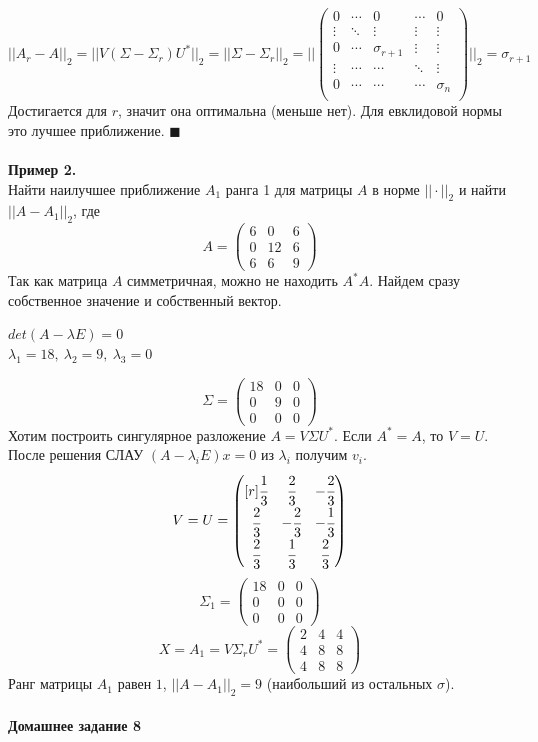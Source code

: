 \documentclass[12pt]{article}
\theoremstyle{definition}
\numberwithin{equation}{section}
\begin{document}
\[||A_r-A||_2=||V(\Sigma-\Sigma_r)U^*||_2=||\Sigma-\Sigma_r||_2 = \Bigg| \Bigg|\begin{pmatrix}
0 & \cdots & 0  & \cdots & 0\\
\vdots & \ddots & \vdots & \vdots & \vdots\\
0 & \cdots & \sigma_{r+1} &  \vdots & \vdots\\
\vdots & \cdots & \cdots & \ddots & \vdots\\
0 & \cdots & \cdots & \cdots & \sigma_n\\
\end{pmatrix}\Bigg|\Bigg|_2=\sigma_{r+1}\]
Достигается для $r$, значит она оптимальна (меньше нет). Для евклидовой нормы это лучшее приближение. $\blacksquare$\\ \\
\textbf{Пример 2.}\\
Найти наилучшее приближение $A_1$ ранга 1 для матрицы $A$ в норме $||\cdot||_2$ и найти $||A-A_1||_2$, где
\[A = \begin{pmatrix}
6 & 0 & 6\\
0 & 12 & 6\\
6 & 6 & 9
\end{pmatrix}\]
Так как матрица $A$ симметричная, можно не находить $A^*A$. Найдем сразу собственное значение и собственный вектор.
\begin{center}
$det(A-\lambda E)=0$\\
$\lambda_1=18,~\lambda_2=9,~\lambda_3=0$\end{center}
\[\Sigma = \begin{pmatrix}
18 & 0 & 0\\
0 & 9 & 0\\
0 & 0 & 0
\end{pmatrix}\]
Хотим построить сингулярное разложение $A=V\Sigma U^*$. Если $A^*=A$, то $V=U$.\\
После решения СЛАУ $(A-\lambda_i E)x=0$ из $\lambda_i$ получим $v_i$.
\[V=U= \begin{pmatrix} [r]
\cfrac{1}{3} & \cfrac{2}{3} & -\cfrac{2}{3}\\
\cfrac{2}{3} & -\cfrac{2}{3} & -\cfrac{1}{3}\\
\cfrac{2}{3} & \cfrac{1}{3} & \cfrac{2}{3}
\end{pmatrix}\]
\[\Sigma_1 = \begin{pmatrix}
18 & 0 & 0\\
0 & 0 & 0\\
0 & 0 & 0
\end{pmatrix}\]
\[X=A_1 = V\Sigma_r U^*=\begin{pmatrix}
2 & 4 & 4\\
4 & 8 & 8\\
4 & 8 & 8
\end{pmatrix}\]
Ранг матрицы $A_1$ равен $1$, $||A-A_1||_2=9$ (наибольший из остальных $\sigma$).\\ \\
\noindent \textbf{Домашнее задание 8}
\end{document}
